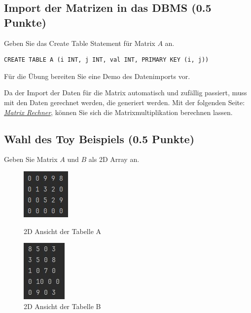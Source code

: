 \documentclass[11pt]{scrartcl}
\begin{document}
\subsection*{Import der Matrizen in das DBMS (0.5 Punkte)}

Geben Sie das Create Table Statement für Matrix $A$ an.

\begin{lstlisting}[style=dmrsql]
  CREATE TABLE A (i INT, j INT, val INT, PRIMARY KEY (i, j))
\end{lstlisting}

Für die Übung bereiten Sie eine Demo des Datenimports vor.

Da der Import der Daten für die Matrix automatisch und zufällig passiert, muss mit den Daten gerechnet werden, die generiert werden. 
Mit der folgenden Seite: \href{https://matrixcalc.org/de/}{\textit{Matrix Rechner}}, können Sie sich die Matrixmultiplikation berechnen lassen. 

\subsection*{Wahl des Toy Beispiels (0.5 Punkte)}

Geben Sie Matrix $A$ und $B$ als 2D Array an.
\begin{figure}[H]
    \begin{minipage}[b]{.4\linewidth}
        \begin{center}
            \includegraphics{2d_table_matrix_a.jpg}
        \end{center}
        \caption{2D Ansicht der Tabelle A}
    \end{minipage}
    \hspace{.1\linewidth}
    \begin{minipage}[b]{.4\linewidth}
        \begin{center}
            \includegraphics{2d_table_matrix_b.jpg} 
        \end{center}
        \caption{2D Ansicht der Tabelle B}
    \end{minipage}
\end{figure}
\end{document}
